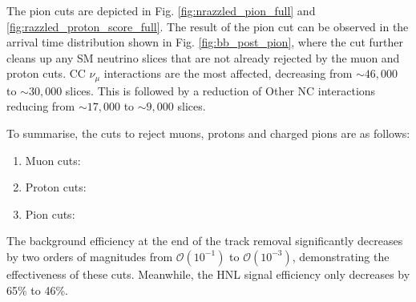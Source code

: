 The pion cuts are depicted in Fig. \ref{fig:nrazzled_pion_full} and \ref{fig:razzled_proton_score_full}. 
The result of the pion cut can be observed in the arrival time distribution shown in Fig. \ref{fig:bb_post_pion}, where the cut further cleans up any SM neutrino slices that are not already rejected by the muon and proton cuts.  
CC $\nu_\mu$ interactions are the most affected, decreasing from $\sim46,000$ to $\sim30,000$ slices.
This is followed by a reduction of Other NC interactions reducing from $\sim17,000$ to $\sim9,000$ slices.

To summarise, the cuts to reject muons, protons and charged pions are as follows:
\begin{enumerate}
\item Muon cuts:
\item Proton cuts:
\item Pion cuts:
\end{enumerate}
The background efficiency at the end of the track removal significantly decreases by two orders of magnitudes from $\mathcal{O}(10^{-1})$ to $\mathcal{O}(10^{-3})$, demonstrating the effectiveness of these cuts.
Meanwhile, the HNL signal efficiency only decreases by 65\% to 46\%.

